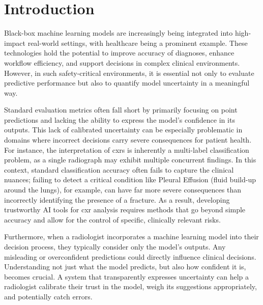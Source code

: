 \chapter{Introduction}
\label{ch:introduction}

Black-box machine learning models are increasingly being integrated
into high-impact real-world settings, with healthcare being a prominent example.
These technologies hold the potential to improve accuracy of diagnoses,
enhance workflow efficiency, and support decisions in complex clinical environments.
However, in such safety-critical environments,
it is essential not only to evaluate predictive performance
but also to quantify model uncertainty in a meaningful way.

Standard evaluation metrics often fall short
by primarily focusing on point predictions
and lacking the ability to express the model's confidence in its outputs.
This lack of calibrated uncertainty can be especially problematic in domains where
incorrect decisions carry severe consequences for patient health.
For instance, the interpretation of \glspl{cxr}
is inherently a multi-label classification problem,
as a single radiograph may exhibit multiple concurrent findings.
In this context, standard classification accuracy often fails to capture the clinical nuances;
failing to detect a critical condition like Pleural Effusion (fluid build-up around the lungs),
for example, can have far more severe consequences than
incorrectly identifying the presence of a fracture.
As a result, developing trustworthy AI tools for \gls{cxr} analysis
requires methods that go beyond simple accuracy
and allow for the control of specific, clinically relevant risks.

Furthermore, when a radiologist incorporates a machine learning model into their decision process,
they typically consider only the model's outputs.
Any misleading or overconfident predictions could directly influence clinical decisions.
Understanding not just what the model predicts, but also how confident it is, becomes crucial.
A system that transparently expresses uncertainty
can help a radiologist calibrate their trust in the model,
weigh its suggestions appropriately, and potentially catch errors.

